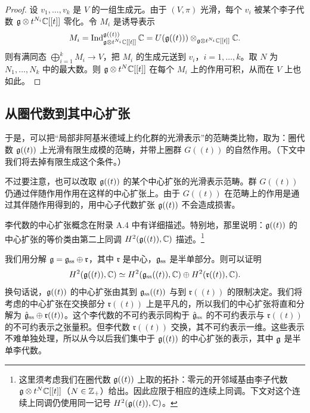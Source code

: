 \begin{proof}
    设 $v_1,\dots,v_k$ 是 $V$ 的一组生成元。由于 $(V,\pi)$ 光滑，每个 $v_i$ 被某个李子代数 $\mathfrak{g}\otimes t^{N_i}\mathbb{C}[[t]]$ 零化。令 $M_i$ 是诱导表示
    \[
        M_i=\operatorname{Ind}_{\mathfrak{g}\otimes t^{N_i}\mathbb{C}[[t]]}^{\mathfrak{g}((t))}\mathbb{C}
        =U(\mathfrak{g}((t)))\otimes_{\mathfrak{g}\otimes t^{N_i}\mathbb{C}[[t]]}\mathbb{C}.
    \]
    则有满同态 $\bigoplus_{i=1}^{k}M_i\to V$，把 $M_i$ 的生成元送到 $v_i$，$i=1,\dots,k$。取 $N$ 为 $N_1,\dots,N_k$ 中的最大数。则 $\mathfrak{g}\otimes t^N\mathbb{C}[[t]]$ 在每个 $M_i$ 上的作用可积，从而在 $V$ 上也如此。
\end{proof}


\subsection{从圈代数到其中心扩张}

于是，可以把“局部非阿基米德域上约化群的光滑表示”的范畴类比物，取为：圈代数 $\mathfrak{g}((t))$ 上光滑有限生成模的范畴，并带上圈群 $G((t))$ 的自然作用。（下文中我们将去掉有限生成这个条件。）


不过要注意，也可以改取 $\mathfrak{g}((t))$ 的某个中心扩张的光滑表示范畴。群 $G((t))$ 仍通过伴随作用作用在这样的中心扩张上。由于 $G((t))$ 在范畴上的作用是通过其伴随作用得到的，用中心子代数扩张 $\mathfrak{g}((t))$ 不会造成损害。

李代数的中心扩张概念在附录 A.4 中有详细描述。特别地，那里说明：$\mathfrak{g}((t))$ 的中心扩张的等价类由第二上同调 $H^2(\mathfrak{g}((t)),\mathbb{C})$ 描述。\footnote{这里须考虑我们在圈代数 $\mathfrak{g}((t))$ 上取的拓扑：零元的开邻域基由李子代数 $\mathfrak{g}\otimes t^N\mathbb{C}[[t]]$（$N\in\mathbb{Z}_+$）给出。因此应限于相应的连续上同调。下文对这个连续上同调仍使用同一记号 $H^2(\mathfrak{g}((t)),\mathbb{C})$。}

我们用分解 $\mathfrak{g}=\mathfrak{g}_{\mathrm{ss}}\oplus\mathfrak{r}$，其中 $\mathfrak{r}$ 是中心，$\mathfrak{g}_{\mathrm{ss}}$ 是半单部分。则可以证明
\[
    H^2(\mathfrak{g}((t)),\mathbb{C})\simeq H^2(\mathfrak{g}_{\mathrm{ss}}((t)),\mathbb{C})\oplus H^2(\mathfrak{r}((t)),\mathbb{C}).
\]
换句话说，$\mathfrak{g}((t))$ 的中心扩张由其到 $\mathfrak{g}_{\mathrm{ss}}((t))$ 与到 $\mathfrak{r}((t))$ 的限制决定。我们将考虑的中心扩张在交换部分 $\mathfrak{r}((t))$ 上是平凡的，所以我们的中心扩张将直和分解为 $\hat{\mathfrak{g}}_{\mathrm{ss}}\oplus\mathfrak{r}((t))$。这个李代数的不可约表示同构于 $\hat{\mathfrak{g}}_{\mathrm{ss}}$ 的不可约表示与 $\mathfrak{r}((t))$ 的不可约表示之张量积。但李代数 $\mathfrak{r}((t))$ 交换，其不可约表示一维。这些表示不难单独处理，所以从今以后我们集中于 $\mathfrak{g}((t))$ 的中心扩张的表示，其中 $\mathfrak{g}$ 是半单李代数。


